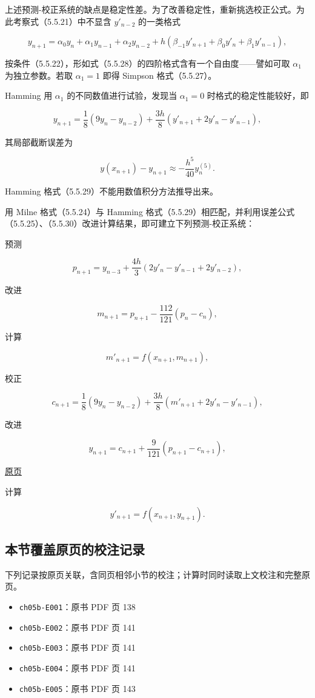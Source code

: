 \documentclass[
  10pt,
  fontset=fandol]{ctexart}
\providecommand{\tightlist}{%
  \setlength{\itemsep}{0pt}\setlength{\parskip}{0pt}}
\begin{document}
上述预测-校正系统的缺点是稳定性差。为了改善稳定性，重新挑选校正公式。为此考察式（5.5.21）中不显含 \(y'_{n-2}\) 的一类格式

\[
y_{n+1}=\alpha_0y_n+\alpha_1y_{n-1}+\alpha_2y_{n-2}+h(\beta_{-1}y'_{n+1}+\beta_0y'_n+\beta_1y'_{n-1}),
\tag{5.5.28}
\]

按条件（5.5.22），形如式（5.5.28）的四阶格式含有一个自由度------譬如可取 \(\alpha_1\) 为独立参数。若取 \(\alpha_1=1\) 即得 Simpson 格式（5.5.27）。

Hamming 用 \(\alpha_1\) 的不同数值进行试验，发现当 \(\alpha_1=0\) 时格式的稳定性能较好，即

\[
y_{n+1}=\frac18(9y_n-y_{n-2})+\frac{3h}{8}(y'_{n+1}+2y'_n-y'_{n-1}),
\tag{5.5.29}
\]

其局部截断误差为

\[
y(x_{n+1})-y_{n+1}\approx-\frac{h^5}{40}y_n^{(5)}.
\tag{5.5.30}
\]

Hamming 格式（5.5.29）不能用数值积分方法推导出来。

用 Milne 格式（5.5.24）与 Hamming 格式（5.5.29）相匹配，并利用误差公式（5.5.25）、（5.5.30）改进计算结果，即可建立下列预测-校正系统：

预测

\[
p_{n+1}=y_{n-3}+\frac{4h}{3}(2y'_n-y'_{n-1}+2y'_{n-2}),
\]

改进

\[
m_{n+1}=p_{n+1}-\frac{112}{121}(p_n-c_n),
\]

计算

\[
m'_{n+1}=f(x_{n+1},m_{n+1}),
\]

校正

\[
c_{n+1}=\frac18(9y_n-y_{n-2})+\frac{3h}{8}(m'_{n+1}+2y'_n-y'_{n-1}),
\]

改进

\[
y_{n+1}=c_{n+1}+\frac9{121}(p_{n+1}-c_{n+1}),
\]

\href{../../source-images/pdf-145.jpeg}{原页}

计算

\[
y'_{n+1}=f(x_{n+1},y_{n+1}).
\]

\subsection{本节覆盖原页的校注记录}\label{ux672cux8282ux8986ux76d6ux539fux9875ux7684ux6821ux6ce8ux8bb0ux5f55}

下列记录按原页关联，含同页相邻小节的校注；计算时同时读取上文校注和完整原页。

\begin{itemize}
\tightlist
\item
  \texttt{ch05b-E001}：原书 PDF 页 138
\item
  \texttt{ch05b-E002}：原书 PDF 页 141
\item
  \texttt{ch05b-E003}：原书 PDF 页 141
\item
  \texttt{ch05b-E004}：原书 PDF 页 141
\item
  \texttt{ch05b-E005}：原书 PDF 页 143
\end{itemize}
\end{document}
